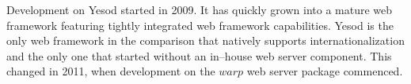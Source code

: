 Development on Yesod started in 2009. It has quickly grown into a mature web framework featuring tightly integrated web framework capabilities. 
Yesod  is the only web framework in the comparison that natively supports internationalization and the only one that started without an in--house web server component.
This changed in 2011, when development on the $ warp $ web server package commenced.